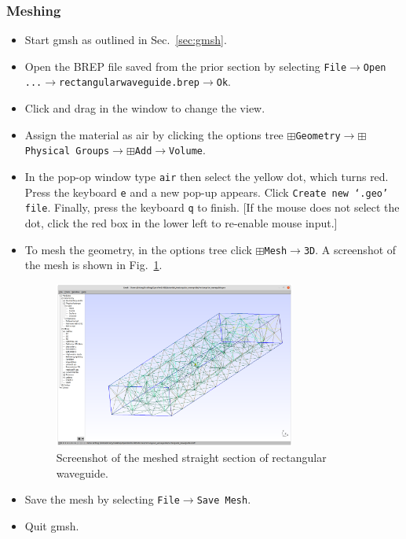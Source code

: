 \documentclass[titlepage]{article}
\renewcommand\_{\textunderscore\linebreak[1]}
\begin{document}
\subsubsection{Meshing}

\begin{itemize}
\item Start gmsh as outlined in Sec.~\ref{sec:gmsh}.
\item Open the BREP file saved from the prior section by selecting \newline \texttt{File}$\rightarrow$\texttt{Open ...}$\rightarrow$\texttt{rectangular\_waveguide.brep}$\rightarrow$\texttt{Ok}.
\item Click and drag in the window to change the view.
\item Assign the material as air by clicking the options tree \newline$\boxplus$\texttt{Geometry}$\rightarrow$$\boxplus$\texttt{Physical Groups}$\rightarrow$$\boxplus$\texttt{Add}$\rightarrow$\texttt{Volume}.
\item In the pop-op window type \texttt{air} then select the yellow dot, which turns red.  Press the keyboard \texttt{e} and a new pop-up appears.  Click \texttt{Create new `.geo' file}.  Finally, press the keyboard \texttt{q} to finish.  [If the mouse does not select the dot, click the red box in the lower left to re-enable mouse input.]
\item To mesh the geometry, in the options tree click $\boxplus$\texttt{Mesh}$\rightarrow$\texttt{3D}. A screenshot of the mesh is shown in Fig.~\ref{fig:mesh}.
\begin{figure}
  \centering
  \includegraphics[width=0.75\textwidth]{../tutorials/OpenParEM3D/rectangular_waveguide/screenshots/mesh}
  \caption{Screenshot of the meshed straight section of rectangular waveguide.}
  \label{fig:mesh}
\end{figure}
\item Save the mesh by selecting \texttt{File}$\rightarrow$\texttt{Save Mesh}.
\item Quit gmsh.
\end{itemize}
\end{document}
